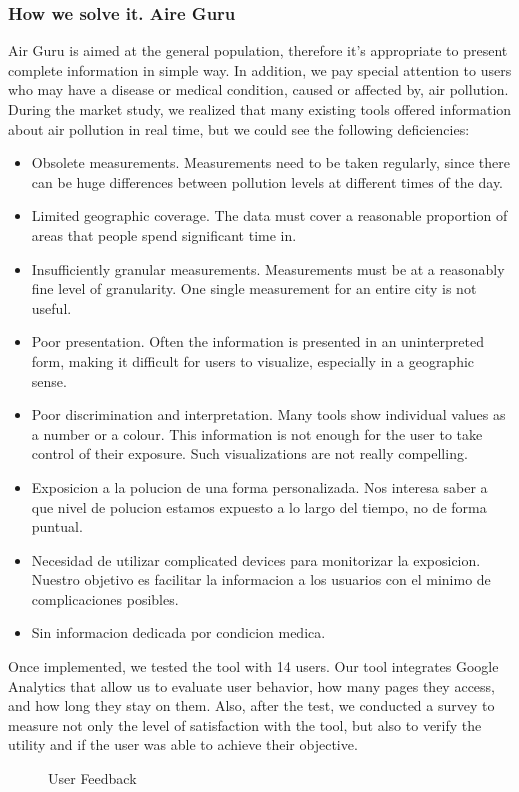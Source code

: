 \subsubsection{How we solve it. Aire Guru} 
Air Guru is aimed at the general population, therefore it's appropriate to present complete information in simple way. In addition, we pay special attention to users who may have a
disease or medical condition, caused or affected by, air pollution.
During the market study, we realized that many existing tools offered information about air pollution in real time, but we could see the following deficiencies:
\begin{itemize}
    \item Obsolete measurements. Measurements need to be taken regularly, since there can be huge differences
    between pollution levels at different times of the day.
    \item Limited geographic coverage. The data must cover a reasonable proportion of areas that people spend significant time in.
    \item Insufficiently granular measurements. Measurements must be at a reasonably fine level of granularity. One single measurement for an entire city is not useful.
    \item Poor presentation. Often the information is presented in an uninterpreted form, making it difficult for users to visualize, especially in a geographic sense.
    \item Poor discrimination and interpretation. Many tools show individual values as a number or a colour. This information is not
    enough for the user to take control of their exposure. Such visualizations are not really compelling. 
    \item Exposicion a la polucion de una forma personalizada. Nos interesa saber a que nivel de polucion estamos expuesto
    a lo largo del tiempo, no de forma puntual.
    \item Necesidad de utilizar complicated devices para monitorizar la exposicion. Nuestro objetivo es facilitar la informacion a los 
    usuarios con el minimo de complicaciones posibles.
    \item Sin informacion dedicada por condicion medica.
\end{itemize}

Once implemented, we tested the tool with 14 users. Our tool integrates Google Analytics that allow us to evaluate
user behavior, how many pages they access, and how long they stay on them. Also, after the test, we conducted a survey to measure not only the level of satisfaction with the tool, but also to verify the utility and if the user was able to achieve their objective.
\begin{figure}[ht]
    \centering
    \hfill
  
  \caption{User Feedback}
    \end{figure}
 

